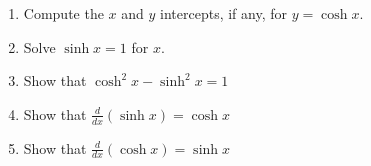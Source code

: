 \documentclass[12pt]{article}
\newif\ifans
\begin{document}
\begin{enumerate}
\begin{enumerate}
\item Compute the $x$ and $y$ intercepts, if any, for $y=\cosh{x}$.

\ifans{\fbox{$y=\cosh{x}$ has a $y$-intercept of  $(0,1)$; but, it does not have any $x$ intercepts.}} \fi

\item Solve $\sinh{x}=1$ for $x$.

\ifans{\fbox{$x=\ln{\left(1+\sqrt{2}\right)}$}} \fi

\item Show that $\cosh^2{x}-\sinh^2{x}=1$

\ifans{\fbox{\parbox{1\linewidth}{
\begin{align*}
\cosh^2{x}-\sinh^{2}{x} & = (\cosh{x}+\sinh{x})(\cosh{x}-\sinh{x})\\
&=\left(\frac{e^x+e^{-x}}{2}+\frac{e^x-e^{-x}}{2}\right)\left(\frac{e^x+e^{-x}}{2}-\frac{e^x-e^{-x}}{2}\right)\\
&=(e^x)(e^{-x})\\
&=1
\end{align*}
}}} \fi

\item Show that $\frac{d}{dx}(\sinh{x})=\cosh{x}$

\ifans{\fbox{\parbox{1\linewidth}{
\begin{align*}
\frac{d}{dx}(\sinh{x}) &= \frac{d}{dx}\left(\frac{e^x-e^{-x}}{2}\right)\\
&=\frac{d}{dx}\left(\frac{1}{2}e^x-\frac{1}{2}e^{-x}\right)\\
&=\frac{1}{2}e^x+\frac{1}{2}e^{-x}\\
&=\frac{e^x+e^{-x}}{2}\\
&=\cosh{x}
\end{align*}
}}} \fi

\item Show that $\frac{d}{dx}(\cosh{x})=\sinh{x}$

\ifans{\fbox{\parbox{1\linewidth}{
\begin{align*}
\frac{d}{dx}(\cosh{x}) &= \frac{d}{dx}\left(\frac{e^x+e^{-x}}{2}\right)\\
&=\frac{d}{dx}\left(\frac{1}{2}e^x+\frac{1}{2}e^{-x}\right)\\
&=\frac{1}{2}e^x-\frac{1}{2}e^{-x}\\
&=\frac{e^x-e^{-x}}{2}\\
&=\sinh{x}
\end{align*}
}}} \fi

\end{enumerate}

\end{enumerate}
\end{document}
